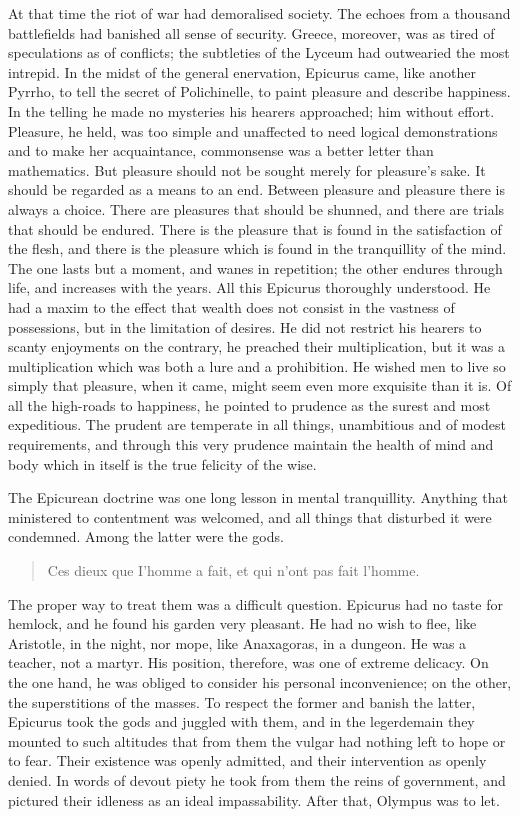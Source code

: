 \documentclass[]{book}
\begin{document}
At that time the riot of war had demoralised society. The echoes from a
thousand battlefields had banished all sense of security. Greece,
moreover, was as tired of speculations as of conflicts; the subtleties
of the Lyceum had outwearied the most intrepid. In the midst of the
general enervation, Epicurus came, like another Pyrrho, to tell the
secret of Polichinelle, to paint pleasure and describe happiness. In the
telling he made no mysteries his hearers approached; him without effort.
Pleasure, he held, was too simple and unaffected to need logical
demonstrations and to make her acquaintance, commonsense was a better
letter than mathematics. But pleasure should not be sought merely for
pleasure's sake. It should be regarded as a means to an end. Between
pleasure and pleasure there is always a choice. There are pleasures that
should be shunned, and there are trials that should be endured. There is
the pleasure that is found in the satisfaction of the flesh, and there
is the pleasure which is found in the tranquillity of the mind. The one
lasts but a moment, and wanes in repetition; the other endures through
life, and increases with the years. All this Epicurus thoroughly
understood. He had a maxim to the effect that wealth does not consist in
the vastness of possessions, but in the limitation of desires. He did
not restrict his hearers to scanty enjoyments on the contrary, he
preached their multiplication, but it was a multiplication which was
both a lure and a prohibition. He wished men to live so simply that
pleasure, when it came, might seem even more exquisite than it is. Of
all the high-roads to happiness, he pointed to prudence as the surest
and most expeditious. The prudent are temperate in all things,
unambitious and of modest requirements, and through this very prudence
maintain the health of mind and body which in itself is the true
felicity of the wise.

The Epicurean doctrine was one long lesson in mental tranquillity.
Anything that ministered to contentment was welcomed, and all things
that disturbed it were condemned. Among the latter were the gods.

\begin{quote}
Ces dieux que I'homme a fait, et qui n'ont pas fait l'homme.
\end{quote}

The proper way to treat them was a difficult question. Epicurus had no
taste for hemlock, and he found his garden very pleasant. He had no wish
to flee, like Aristotle, in the night, nor mope, like Anaxagoras, in a
dungeon. He was a teacher, not a martyr. His position, therefore, was
one of extreme delicacy. On the one hand, he was obliged to consider his
personal inconvenience; on the other, the superstitions of the masses.
To respect the former and banish the latter, Epicurus took the gods and
juggled with them, and in the legerdemain they mounted to such altitudes
that from them the vulgar had nothing left to hope or to fear. Their
existence was openly admitted, and their intervention as openly denied.
In words of devout piety he took from them the reins of government, and
pictured their idleness as an ideal impassability. After that, Olympus
was to let.
\end{document}
